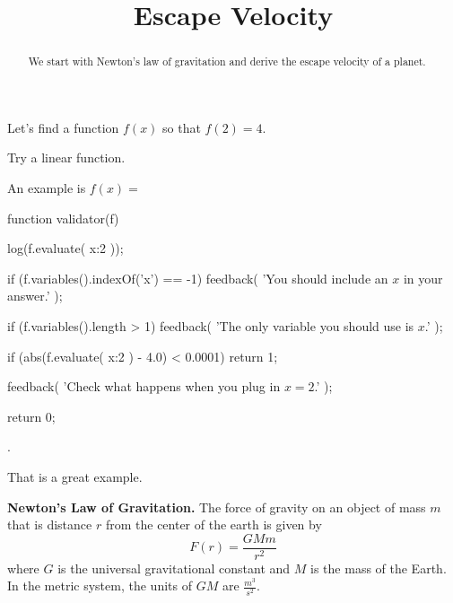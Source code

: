 \documentclass{ximera}
\title{Escape Velocity}
\begin{document}
\begin{abstract}
We start with Newton's law of gravitation and derive the escape velocity of a planet.
\end{abstract}
\maketitle


\begin{exercise}
Let's find a function $f(x)$ so that $f(2) = 4$.

\begin{solution}
\begin{hint}
Try a linear function.
\end{hint}
An example is $f(x) = $ \begin{expression-answer}
  function validator(f) {
    log(f.evaluate( {x:2} ));

    if (f.variables().indexOf('x') == -1) {
      feedback( 'You should include an $x$ in your answer.' );
    }

    if (f.variables().length > 1) {
      feedback( 'The only variable you should use is $x$.' );
    }

    if (abs(f.evaluate( {x:2} ) - 4.0) < 0.0001) {
      return 1;
    }

    feedback( 'Check what happens when you plug in $x=2$.' );

    return 0;
  }
\end{expression-answer}.
\end{solution}

That is a great example.
\end{exercise}


\begin{observation}
\textbf{Newton's Law of Gravitation.} The force of gravity on an object of mass $m$ that is distance $r$ from the center of the earth is given by
$$ F(r) = \frac{G M m}{r^2}$$
where $G$ is the universal gravitational constant and $M$ is the mass of the Earth. In the metric system, the units of $G M$ are $\frac{m^3}{s^2}$.
\end{observation}
\end{document}

